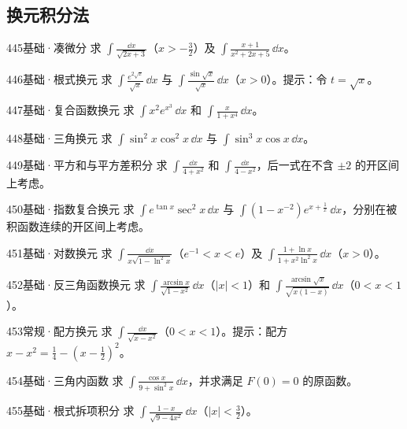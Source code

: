 \subsection{换元积分法}
\begin{exercise}{445}{基础·凑微分}
求 $\int\frac{\dd x}{\sqrt{2x+3}}$（$x>-\frac{3}{2}$）及 $\int\frac{x+1}{x^2+2x+5}\,\dd x$。
\end{exercise}
\begin{exercise}{446}{基础·根式换元}
求 $\int\frac{e^{2\sqrt x}}{\sqrt x}\,\dd x$ 与 $\int\frac{\sin\sqrt x}{\sqrt x}\,\dd x$（$x>0$）。提示：令 $t=\sqrt x$。
\end{exercise}
\begin{exercise}{447}{基础·复合函数换元}
求 $\int x^2e^{x^3}\,\dd x$ 和 $\int\frac{x}{1+x^4}\,\dd x$。
\end{exercise}
\begin{exercise}{448}{基础·三角换元}
求 $\int\sin^2x\cos^2x\,\dd x$ 与 $\int\sin^3x\cos x\,\dd x$。
\end{exercise}
\begin{exercise}{449}{基础·平方和与平方差积分}
求 $\int\frac{\dd x}{4+x^2}$ 和 $\int\frac{\dd x}{4-x^2}$，后一式在不含 $\pm2$ 的开区间上考虑。
\end{exercise}
\begin{exercise}{450}{基础·指数复合换元}
求 $\int e^{\tan x}\sec^2x\,\dd x$ 与 $\int(1-x^{-2})e^{x+\frac{1}{x}}\,\dd x$，分别在被积函数连续的开区间上考虑。
\end{exercise}
\begin{exercise}{451}{基础·对数换元}
求 $\int\frac{\dd x}{x\sqrt{1-\ln^2x}}$（$e^{-1}<x<e$）及 $\int\frac{1+\ln x}{1+x^2\ln^2x}\,\dd x$（$x>0$）。
\end{exercise}
\begin{exercise}{452}{基础·反三角函数换元}
求 $\int\frac{\arcsin x}{\sqrt{1-x^2}}\,\dd x$（$|x|<1$）和 $\int\frac{\arcsin\sqrt x}{\sqrt{x(1-x)}}\,\dd x$（$0<x<1$）。
\end{exercise}
\begin{exercise}{453}{常规·配方换元}
求 $\int\frac{\dd x}{\sqrt{x-x^2}}$（$0<x<1$）。提示：配方 $x-x^2=\frac{1}{4}-(x-\frac{1}{2})^2$。
\end{exercise}
\begin{exercise}{454}{基础·三角内函数}
求 $\int\frac{\cos x}{9+\sin^2x}\,\dd x$，并求满足 $F(0)=0$ 的原函数。
\end{exercise}
\begin{exercise}{455}{基础·根式拆项积分}
求 $\int\frac{1-x}{\sqrt{9-4x^2}}\,\dd x$（$|x|<\frac{3}{2}$）。
\end{exercise}
